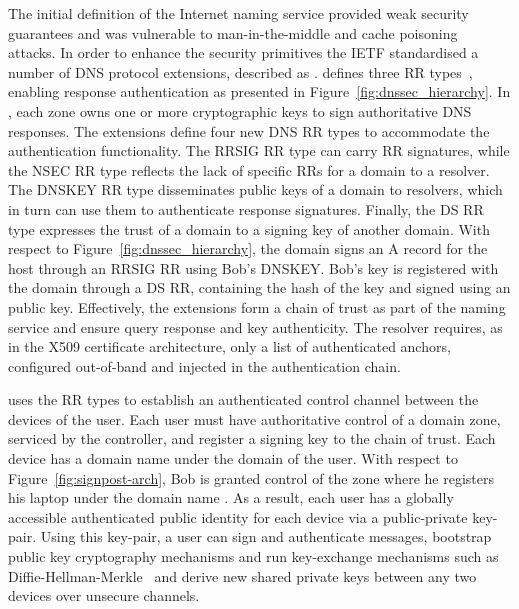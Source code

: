 The initial definition of the Internet naming service provided weak security
guarantees and was vulnerable to man-in-the-middle and cache
poisoning~ attacks.  In order to enhance the security
primitives the IETF standardised a number of DNS protocol extensions, described
as \dnssec.  \dnssec defines three RR types~, enabling response
authentication as presented in Figure~\ref{fig:dnssec_hierarchy}.  In \dnssec,
each zone owns one or more cryptographic keys to sign authoritative DNS
responses. The \dnssec extensions define four new DNS RR types to accommodate
the authentication functionality. The RRSIG RR type can carry RR signatures,
while the NSEC RR type reflects the lack of specific RRs for a domain to a
resolver.  The DNSKEY RR type disseminates public keys of a domain to resolvers,
which in turn can use them to authenticate response signatures. Finally, the DS
RR type expresses the trust of a domain to a signing key of another domain. With
respect to Figure~\ref{fig:dnssec_hierarchy}, the domain  signs an A
record for the host  through an RRSIG RR using Bob's DNSKEY\@.
Bob's key is registered with the  domain through a DS RR, containing the
hash of the key and signed using an  public key.  Effectively, the \dnssec
extensions form a chain of trust as part of the naming service and ensure
query response and key authenticity. The resolver requires, as in the X509
certificate architecture, only a list of authenticated anchors, configured
out-of-band and injected in the authentication chain.

\signpost uses the \dnssec RR types to establish an authenticated control
channel between the devices of the user. Each \signpost user must have
authoritative control of a domain zone, serviced by the \signpost controller,
and register a signing key to the \dnssec chain of trust. Each device has a
domain name under the domain  of the user. With respect to
Figure~\ref{fig:signpost-arch}, Bob is granted control of the zone 
where he registers his laptop under the domain name . As a
result, each \signpost user has a globally accessible authenticated public
identity for each device via a public-private key-pair. Using this key-pair, a
user can sign and authenticate messages, bootstrap public key cryptography
mechanisms and run key-exchange mechanisms such as
Diffie-Hellman-Merkle~ and derive new shared private keys
between any two devices over unsecure channels.

